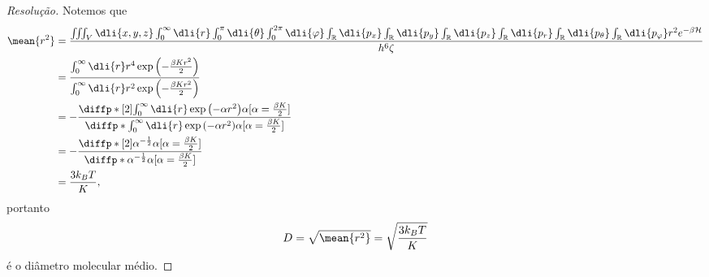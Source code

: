 \begin{proof}[Resolução]
    Notemos que
    \begin{align*}
        \mean{r^2} &= \frac{\iiint_V \dli{x,y,z}\int_{0}^{\infty}\dli{r} \int_0^{\pi}\dli{\theta}\int_0^{2\pi} \dli{\varphi} \int_{\mathbb{R}}\dli{p_x}\int_{\mathbb{R}} \dli{p_y} \int_{\mathbb{R}}\dli{p_z}\int_{\mathbb{R}}\dli{p_r}\int_{\mathbb{R}}\dli{p_\theta} \int_{\mathbb{R}}\dli{p_{\varphi}} r^2 e^{-\beta \mathcal{H}}}{h^6 \zeta}\\
                   &= \frac{\int_0^\infty \dli{r}r^4 \exp\left(-\frac{\beta K r^2}{2}\right)}{\int_0^\infty\dli{r} r^2\exp\left(-\frac{\beta K r^2}{2}\right)}\\
                   &= -\frac{\diffp*[2]{\int_0^\infty \dli{r} \exp\left(-\alpha r^2\right)}{\alpha}[\alpha = \frac{\beta K}{2}]}{\diffp*{\int_0^\infty \dli{r} \exp\left(-\alpha r^2\right)}{\alpha}[\alpha = \frac{\beta K}{2}]}\\
                   &= -\frac{\diffp*[2]{\alpha^{-\frac12}}{\alpha}[\alpha = \frac{\beta K}{2}]}{\diffp*{\alpha^{-\frac12}}{\alpha}[\alpha = \frac{\beta K}{2}]}\\
                   &= \frac{3 k_BT}{K},
    \end{align*}
    portanto
    \begin{equation*}
        D = \sqrt{\mean{r^2}} = \sqrt{\frac{3 k_B T}{K}}
    \end{equation*}
    é o diâmetro molecular médio.
\end{proof}
